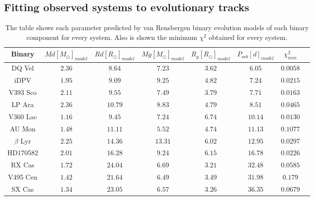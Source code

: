 \subsection{Fitting observed systems to evolutionary tracks}
\begin{table}
\centering
\begin{tabular}{c c c c c c c c}
\hline
\hline
    Binary & 
$Md[M_{\odot}]_{model}$&$Rd[R_{\odot}]_{model}$&$Mg[M_{\odot}]_{model}$&$R_{g}[R_{\odot}]_{model}$&$P_{orb}[d]_{model}$&$\chi^{2}_{min}$\\
    \hline
   
   DQ Vel   & $2.36$ & $8.64$ &$7.23$& $3.62$&$6.05$&$0.0058$\\
   
   iDPV    & $1.95$ & $9.09$ & $9.25$& $4.82$ &$7.24$ &$0.0215$\\
   
   V393 Sco& $2.11$ & $9.55$ & $7.49$& $3.79$& $7.71$ & $0.0163$\\
   
   LP Ara  & $2.36$ &$10.79$ &$8.83$& $4.79$&$8.51$ & $0.0465$\\
   
   V360 Lac& $1.16$ & $9.45$ & $7.24$&$6.74$ & $10.14$ & $0.0130$\\
   
   AU Mon  & $1.48$ & $11.11$ & $5.52$& $4.74$& $11.13$ & $0.1077$ \\
   
   $\beta$ Lyr &$2.25$&$14.36$&$13.31$& $6.02$&$12.95$&$0.0297$\\

HD170582& $2.01$ & $16.28$ &$9.24$ & $6.15$& $16.78$&$0.0226$\\

RX Cas& $1.72$ & $24.04$ & $6.69$ & $3.21$& $32.48$ & $0.0585$\\

V495 Cen& $1.42$ & $21.64$ & $6.49$ & $3.49$& $31.98$ & $0.179$\\

SX Cas& $1.34$ & $23.05$ & $6.57$ &$3.26$ & $36.35$ & $0.0679$&\\
\hline
\end{tabular}
\caption{The table shows each parameter predicted by van Rensbergen binary evolution models of each binary component for every system. Also is shown the minimum $\chi^{2}$ obtained for every system.}
\label{table:prediction}
\end{table}
